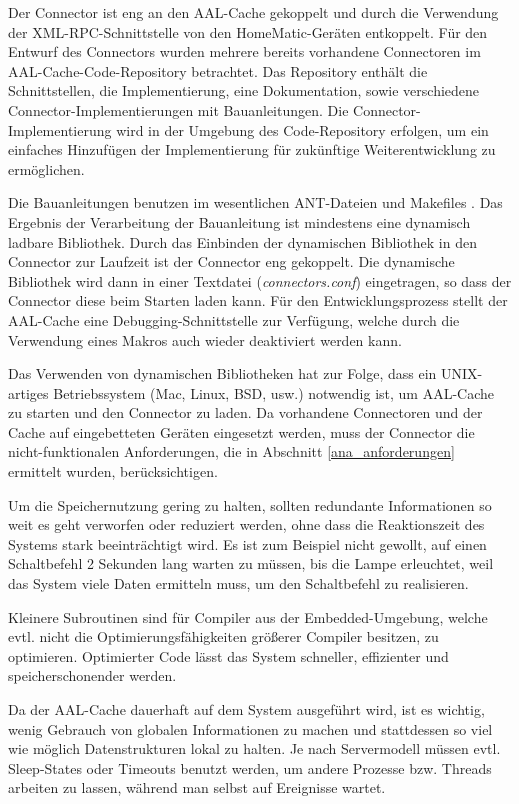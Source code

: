 Der Connector ist eng an den AAL-Cache gekoppelt \cite{aalcache} und durch die Verwendung der XML-RPC-Schnittstelle
von den HomeMatic-Geräten entkoppelt.
Für den Entwurf des Connectors wurden mehrere bereits vorhandene Connectoren im AAL-Cache-Code-Repository \cite{aalcache_code}
betrachtet.
Das Repository enthält die Schnittstellen, die Implementierung, eine Dokumentation, sowie verschiedene Connector-Implementierungen
mit Bauanleitungen.
Die Connector-Implementierung wird in der Umgebung des Code-Repository erfolgen, um ein einfaches Hinzufügen der Implementierung
für zukünftige Weiterentwicklung zu ermöglichen.

Die Bauanleitungen benutzen im wesentlichen ANT-Dateien \cite{ant} und Makefiles \cite{make}.
Das Ergebnis der Verarbeitung der Bauanleitung ist mindestens eine dynamisch ladbare Bibliothek.
Durch das Einbinden der dynamischen Bibliothek in den Connector zur Laufzeit ist der Connector eng gekoppelt.
Die dynamische Bibliothek wird dann in einer Textdatei (\emph{connectors.conf}) eingetragen, so dass der Connector diese
beim Starten laden kann.
Für den Entwicklungsprozess stellt der AAL-Cache eine Debugging-Schnittstelle zur Verfügung, welche durch die Verwendung eines
Makros auch wieder deaktiviert werden kann.

Das Verwenden von dynamischen Bibliotheken hat zur Folge, dass ein UNIX-artiges Betriebssystem (Mac, Linux, BSD, usw.) notwendig
ist, um AAL-Cache zu starten und den Connector zu laden.
Da vorhandene Connectoren und der Cache auf eingebetteten Geräten eingesetzt werden, muss der Connector die nicht-funktionalen
Anforderungen, die in Abschnitt \ref{ana_anforderungen} ermittelt wurden, berücksichtigen.

Um die Speichernutzung gering zu halten, sollten redundante Informationen so weit es geht
verworfen oder reduziert werden, ohne dass die Reaktionszeit des Systems stark beeinträchtigt wird.
Es ist zum Beispiel nicht gewollt, auf einen Schaltbefehl 2 Sekunden lang warten zu müssen,
bis die Lampe erleuchtet, weil das System viele Daten ermitteln muss, um den Schaltbefehl zu realisieren.

Kleinere Subroutinen sind für Compiler aus der Embedded-Umgebung, welche evtl. nicht die
Optimierungsfähigkeiten größerer Compiler besitzen, zu optimieren.
Optimierter Code lässt das System schneller, effizienter und speicherschonender werden.

Da der AAL-Cache dauerhaft auf dem System ausgeführt wird, ist es wichtig, wenig Gebrauch
von globalen Informationen zu machen und stattdessen so viel wie möglich Datenstrukturen
lokal zu halten.
Je nach Servermodell müssen evtl. Sleep-States oder Timeouts benutzt werden, um andere
Prozesse bzw. Threads arbeiten zu lassen, während man selbst auf Ereignisse wartet.

